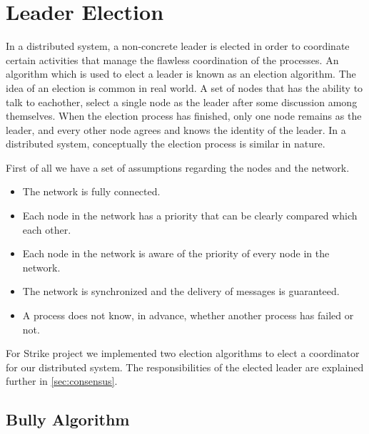 \documentclass[dareport.tex]{subfiles}
\begin{document}
\section{Leader Election} \label{sec:election}
In a distributed system, a non-concrete leader is elected in order to coordinate certain activities that manage the flawless coordination of the processes. An algorithm which is used to elect a leader is known as an election algorithm. The idea of an election is common in real world. A set of nodes that has the ability to talk to eachother, select a single node as the leader after some discussion among themselves. When the election process has finished, only one node remains as the leader, and every other node agrees and knows the identity of the leader. In a distributed system, conceptually the election process is similar in nature. 

First of all we have a set of assumptions regarding the nodes and the network.
\begin{itemize}
\item The network is fully connected.
\item Each node in the network has a priority that can be clearly compared which each other.
\item Each node in the network is aware of the priority of every node in the network.
\item The network is synchronized and the delivery of messages is guaranteed.
\item A process does not know, in advance, whether another process has failed or not.
\end{itemize}



For Strike project we implemented two election algorithms to elect a coordinator for our distributed system. The responsibilities of the elected leader are explained further in \cref{sec:consensus}. 


\subsection{Bully Algorithm} \label{ssec:bully}
\end{document}
